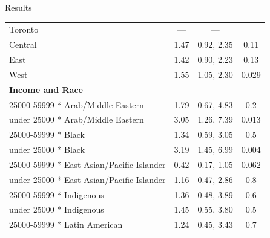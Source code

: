 \documentclass[
  ignorenonframetext,
]{beamer}
\begin{document}
\begin{frame}{Results}
\begin{longtable}{lccc}
\hspace{1em}Toronto & — & — & \\
\hspace{1em}Central & 1.47 & 0.92, 2.35 & 0.11\\
\hspace{1em}East & 1.42 & 0.90, 2.23 & 0.13\\
\hspace{1em}West & 1.55 & 1.05, 2.30 & 0.029\\
\textbf{Income and Race} &  &  & \\
\hspace{1em}25000-59999 * Arab/Middle Eastern & 1.79 & 0.67, 4.83 & 0.2\\
\hspace{1em}under 25000 * Arab/Middle Eastern & 3.05 & 1.26, 7.39 & 0.013\\
\hspace{1em}25000-59999 * Black & 1.34 & 0.59, 3.05 & 0.5\\
\hspace{1em}under 25000 * Black & 3.19 & 1.45, 6.99 & 0.004\\
\hspace{1em}25000-59999 * East Asian/Pacific Islander & 0.42 & 0.17, 1.05 & 0.062\\
\hspace{1em}under 25000 * East Asian/Pacific Islander & 1.16 & 0.47, 2.86 & 0.8\\
\hspace{1em}25000-59999 * Indigenous & 1.36 & 0.48, 3.89 & 0.6\\
\hspace{1em}under 25000 * Indigenous & 1.45 & 0.55, 3.80 & 0.5\\
\hspace{1em}25000-59999 * Latin American & 1.24 & 0.45, 3.43 & 0.7\\
\end{longtable}
\end{frame}
\end{document}
